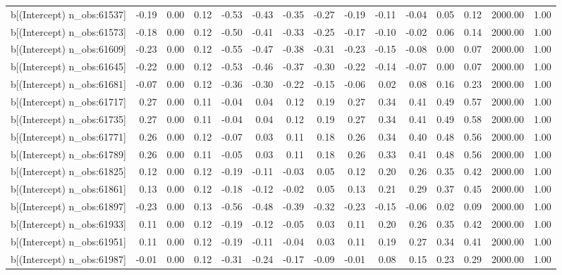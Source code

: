\begin{table}[ht]
\begin{tabular}{rrrrrrrrrrrrrrr}
  b[(Intercept) n\_obs:61537] & -0.19 & 0.00 & 0.12 & -0.53 & -0.43 & -0.35 & -0.27 & -0.19 & -0.11 & -0.04 & 0.05 & 0.12 & 2000.00 & 1.00 \\ 
  b[(Intercept) n\_obs:61573] & -0.18 & 0.00 & 0.12 & -0.50 & -0.41 & -0.33 & -0.25 & -0.17 & -0.10 & -0.02 & 0.06 & 0.14 & 2000.00 & 1.00 \\ 
  b[(Intercept) n\_obs:61609] & -0.23 & 0.00 & 0.12 & -0.55 & -0.47 & -0.38 & -0.31 & -0.23 & -0.15 & -0.08 & 0.00 & 0.07 & 2000.00 & 1.00 \\ 
  b[(Intercept) n\_obs:61645] & -0.22 & 0.00 & 0.12 & -0.53 & -0.46 & -0.37 & -0.30 & -0.22 & -0.14 & -0.07 & 0.00 & 0.07 & 2000.00 & 1.00 \\ 
  b[(Intercept) n\_obs:61681] & -0.07 & 0.00 & 0.12 & -0.36 & -0.30 & -0.22 & -0.15 & -0.06 & 0.02 & 0.08 & 0.16 & 0.23 & 2000.00 & 1.00 \\ 
  b[(Intercept) n\_obs:61717] & 0.27 & 0.00 & 0.11 & -0.04 & 0.04 & 0.12 & 0.19 & 0.27 & 0.34 & 0.41 & 0.49 & 0.57 & 2000.00 & 1.00 \\ 
  b[(Intercept) n\_obs:61735] & 0.27 & 0.00 & 0.11 & -0.04 & 0.04 & 0.12 & 0.19 & 0.27 & 0.34 & 0.41 & 0.49 & 0.58 & 2000.00 & 1.00 \\ 
  b[(Intercept) n\_obs:61771] & 0.26 & 0.00 & 0.12 & -0.07 & 0.03 & 0.11 & 0.18 & 0.26 & 0.34 & 0.40 & 0.48 & 0.56 & 2000.00 & 1.00 \\ 
  b[(Intercept) n\_obs:61789] & 0.26 & 0.00 & 0.11 & -0.05 & 0.03 & 0.11 & 0.18 & 0.26 & 0.33 & 0.41 & 0.48 & 0.56 & 2000.00 & 1.00 \\ 
  b[(Intercept) n\_obs:61825] & 0.12 & 0.00 & 0.12 & -0.19 & -0.11 & -0.03 & 0.05 & 0.12 & 0.20 & 0.26 & 0.35 & 0.42 & 2000.00 & 1.00 \\ 
  b[(Intercept) n\_obs:61861] & 0.13 & 0.00 & 0.12 & -0.18 & -0.12 & -0.02 & 0.05 & 0.13 & 0.21 & 0.29 & 0.37 & 0.45 & 2000.00 & 1.00 \\ 
  b[(Intercept) n\_obs:61897] & -0.23 & 0.00 & 0.13 & -0.56 & -0.48 & -0.39 & -0.32 & -0.23 & -0.15 & -0.06 & 0.02 & 0.09 & 2000.00 & 1.00 \\ 
  b[(Intercept) n\_obs:61933] & 0.11 & 0.00 & 0.12 & -0.19 & -0.12 & -0.05 & 0.03 & 0.11 & 0.20 & 0.26 & 0.35 & 0.42 & 2000.00 & 1.00 \\ 
  b[(Intercept) n\_obs:61951] & 0.11 & 0.00 & 0.12 & -0.19 & -0.11 & -0.04 & 0.03 & 0.11 & 0.19 & 0.27 & 0.34 & 0.41 & 2000.00 & 1.00 \\ 
  b[(Intercept) n\_obs:61987] & -0.01 & 0.00 & 0.12 & -0.31 & -0.24 & -0.17 & -0.09 & -0.01 & 0.08 & 0.15 & 0.23 & 0.29 & 2000.00 & 1.00 \\ 

\end{tabular}
\end{table}
